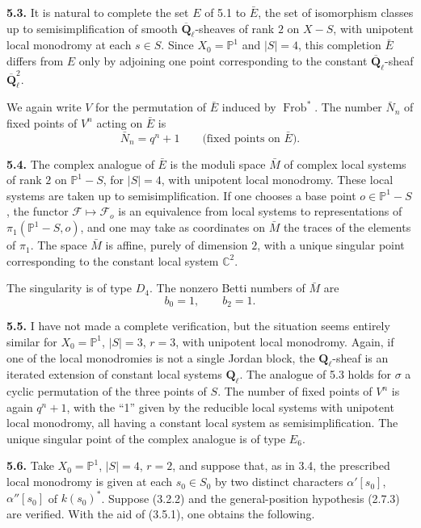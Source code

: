 \documentclass[11pt]{article}
\newcommand{\Qbl}{\overline{\mathbf{Q}}_{\ell}}
\newcommand{\Ql}{\mathbf{Q}_{\ell}}
\newcommand{\Frob}{\operatorname{Frob}}
\newcommand{\C}{\mathbb{C}}
\newcommand{\Pone}{\mathbb{P}^{1}}
\newcommand{\para}[1]{\medskip\noindent\textbf{#1}\enspace}
\begin{document}
\para{5.3.} It is natural to complete the set \(E\) of 5.1 to \(\bar E\), the set of isomorphism classes up to semisimplification of smooth \(\Qbl\)-sheaves of rank \(2\) on \(X-S\), with unipotent local monodromy at each \(s\in S\). Since \(X_0=\Pone\) and \(|S|=4\), this completion \(\bar E\) differs from \(E\) only by adjoining one point corresponding to the constant \(\Qbl\)-sheaf \(\Qbl^2\).

We again write \(V\) for the permutation of \(\bar E\) induced by \(\Frob^*\). The number \(\bar N_n\) of fixed points of \(V^n\) acting on \(\bar E\) is
\begin{equation}
  \bar N_n=q^n+1 \qquad \text{(fixed points on \(\bar E\)).}
\tag{5.3.1}
\end{equation}

\para{5.4.} The complex analogue of \(\bar E\) is the moduli space \(\bar M\) of complex local systems of rank \(2\) on \(\Pone-S\), for \(|S|=4\), with unipotent local monodromy. These local systems are taken up to semisimplification. If one chooses a base point \(o\in\Pone-S\), the functor \(\mathcal F\mapsto \mathcal F_o\) is an equivalence from local systems to representations of \(\pi_1(\Pone-S,o)\), and one may take as coordinates on \(\bar M\) the traces of the elements of \(\pi_1\). The space \(\bar M\) is affine, purely of dimension \(2\), with a unique singular point corresponding to the constant local system \(\C^2\).

The singularity is of type \(D_4\). The nonzero Betti numbers of \(\bar M\) are
\begin{equation}
  b_0=1,\qquad b_2=1.
\tag{5.4.1}
\end{equation}

\para{5.5.} I have not made a complete verification, but the situation seems entirely similar for \(X_0=\Pone\), \(|S|=3\), \(r=3\), with unipotent local monodromy. Again, if one of the local monodromies is not a single Jordan block, the \(\Ql\)-sheaf is an iterated extension of constant local systems \(\Ql\). The analogue of 5.3 holds for \(\sigma\) a cyclic permutation of the three points of \(S\). The number of fixed points of \(V^n\) is again \(q^n+1\), with the ``1'' given by the reducible local systems with unipotent local monodromy, all having a constant local system as semisimplification. The unique singular point of the complex analogue is of type \(E_6\).

\para{5.6.} Take \(X_0=\Pone\), \(|S|=4\), \(r=2\), and suppose that, as in 3.4, the prescribed local monodromy is given at each \(s_0\in S_0\) by two distinct characters \(\alpha'[s_0]\), \(\alpha''[s_0]\) of \(k(s_0)^*\). Suppose (3.2.2) and the general-position hypothesis (2.7.3) are verified. With the aid of (3.5.1), one obtains the following.
\end{document}

